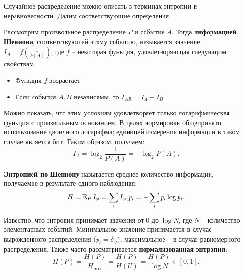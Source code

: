 Случайное распределение можно описать в терминах энтропии и неравновесности. Дадим соответствующие определения:
\begin{definition}
    Рассмотрим произвольное распределение $P$ и событие $A$. Тогда \textbf{информацией Шеннона}, соответствующей этому событию, называется значение $I_A = f\left( \frac{1}{P(A)} \right)$, где $f$ -- некоторая функция, удовлетворяющая следующим свойствам:
    \begin{itemize}
    \item
        Функция $f$ возрастает;
    \item
        Если события $A, B$ независимы, то $I_{AB} = I_{A} + I_{B}$.
    \end{itemize}
    
    Можно показать, что этим условиям удовлетворяет только логарифмическая функция с произвольным основанием. В целях нормировки общепринято использование двоичного логарифма; единицей измерения информации в таком случае является бит. Таким образом, получаем:
    \begin{equation*}
        I_A = \log_2 \frac{1}{P(A)} = -\log_2 P(A).
    \end{equation*}
\end{definition}

\begin{definition}
    \textbf{Энтропией по Шеннону} называется среднее количество информации, получаемое в результате одного наблюдения:
    \begin{equation*}
        H = \operatorname{\mathbb{E}}_{P} I_{\omega} = \sum_{i} I_{\omega_i} p_i = -\sum_i p_i \log p_i.
    \end{equation*}
    
    Известно, что энтропия принимает значения от $0$ до $\log N$, где $N$ -- количество элементарных событий.
    Минимальное значение принимается в случае вырожденного распределения ($p_i = \delta_{ij}$), максимальное -- в случае равномерного распределения. Также часто рассматривается \textbf{нормализованная энтропия}:
    \begin{equation*}
        \bar{H}(P) = \frac{H(P)}{H_{\text{max}}} = \frac{H(P)}{H(U)} = \frac{H(P)}{\log N} \in \left[ 0, 1 \right].
    \end{equation*}
\end{definition}

